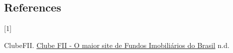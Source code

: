 \documentclass[
]{article}
\newlength{\cslhangindent}
\newlength{\csllabelwidth}
\newlength{\cslentryspacingunit} %
\newenvironment{CSLReferences}[2] %
 {%
  \setlength{\parindent}{0pt}
  \ifodd #1
  \let\oldpar\par
  \def\par{\hangindent=\cslhangindent\oldpar}
  \fi
  \setlength{\parskip}{#2\cslentryspacingunit}
 }%
 {}
\newcommand{\CSLLeftMargin}[1]{\parbox[t]{\csllabelwidth}{#1}}
\newcommand{\CSLRightInline}[1]{\parbox[t]{\linewidth - \csllabelwidth}{#1}\break}
\begin{document}
\hypertarget{references}{%
\subsection*{References}\label{references}}

\hypertarget{refs}{}
\begin{CSLReferences}{0}{0}
\leavevmode{}%
\CSLLeftMargin{{[}1{]} }%
\CSLRightInline{ClubeFII. \href{https://www.clubefii.com.br}{Clube FII -
O maior site de Fundos Imobiliários do Brasil} n.d.}

\end{CSLReferences}
\end{document}
